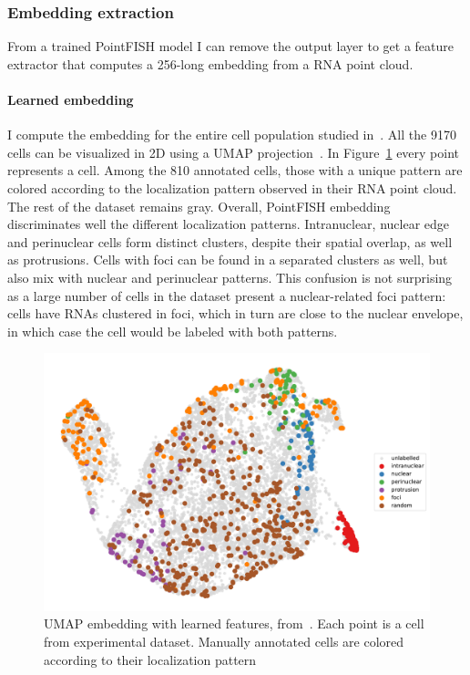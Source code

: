 \subsubsection{Embedding extraction}

From a trained PointFISH model I can remove the output layer to get a feature extractor that computes a 256-long embedding from a \ac{RNA} point cloud.

\paragraph{Learned embedding}

I compute the embedding for the entire cell population studied in~\cite{CHOUAIB_2020}.
All the 9170 cells can be visualized in 2D using a UMAP projection~\cite{McInnes2018}.
In Figure~\ref{fig:umap_real} every point represents a cell.
Among the 810 annotated cells, those with a unique pattern are colored according to the localization pattern observed in their \ac{RNA} point cloud.
The rest of the dataset remains gray.
Overall, PointFISH embedding discriminates well the different localization patterns.
Intranuclear, nuclear edge and perinuclear cells form distinct clusters, despite their spatial overlap, as well as protrusions.
Cells with foci can be found in a separated clusters as well, but also mix with nuclear and perinuclear patterns.
This confusion is not surprising as a large number of cells in the dataset present a nuclear-related foci pattern: cells have \ac{RNA}s clustered in foci, which in turn are close to the nuclear envelope, in which case the cell would be labeled with both patterns.

\begin{figure}[]
    \centering
    \includegraphics[width=\textwidth]{figures/chapter4/umap_real}
    \caption[UMAP embedding with exprimental dataset]{UMAP embedding with learned features, from~\cite{pointfish_2022}.
	Each point is a cell from experimental dataset.
	Manually annotated cells are colored according to their localization pattern}
    \label{fig:umap_real}
\end{figure}

